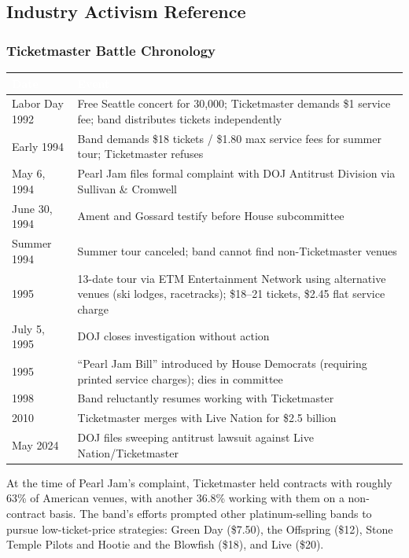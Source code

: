 \documentclass[11pt,letterpaper]{article}
\newcommand{\tableheader}[1]{\textbf{\sffamily\textcolor{white}{#1}}}
\begin{document}
\subsection{Industry Activism Reference}

\subsubsection{Ticketmaster Battle Chronology}

\begin{center}
\begin{tabularx}{\textwidth}{L{2.5cm}X}
\toprule
{}
\tableheader{Date} & \tableheader{Event} \\
\midrule
Labor Day 1992 & Free Seattle concert for 30,000; Ticketmaster demands \$1 service fee; band distributes tickets independently \\
Early 1994 & Band demands \$18 tickets / \$1.80 max service fees for summer tour; Ticketmaster refuses \\
May 6, 1994 & Pearl Jam files formal complaint with DOJ Antitrust Division via Sullivan \& Cromwell \\
June 30, 1994 & Ament and Gossard testify before House subcommittee \\
Summer 1994 & Summer tour canceled; band cannot find non-Ticketmaster venues \\
1995 & 13-date tour via ETM Entertainment Network using alternative venues (ski lodges, racetracks); \$18--21 tickets, \$2.45 flat service charge \\
July 5, 1995 & DOJ closes investigation without action \\
1995 & ``Pearl Jam Bill'' introduced by House Democrats (requiring printed service charges); dies in committee \\
1998 & Band reluctantly resumes working with Ticketmaster \\
2010 & Ticketmaster merges with Live Nation for \$2.5 billion \\
May 2024 & DOJ files sweeping antitrust lawsuit against Live Nation/Ticketmaster \\
\bottomrule
\end{tabularx}
\end{center}

At the time of Pearl Jam's complaint, Ticketmaster held contracts with roughly 63\% of American venues, with another 36.8\% working with them on a non-contract basis. The band's efforts prompted other platinum-selling bands to pursue low-ticket-price strategies: Green Day (\$7.50), the Offspring (\$12), Stone Temple Pilots and Hootie and the Blowfish (\$18), and Live (\$20).
\end{document}
